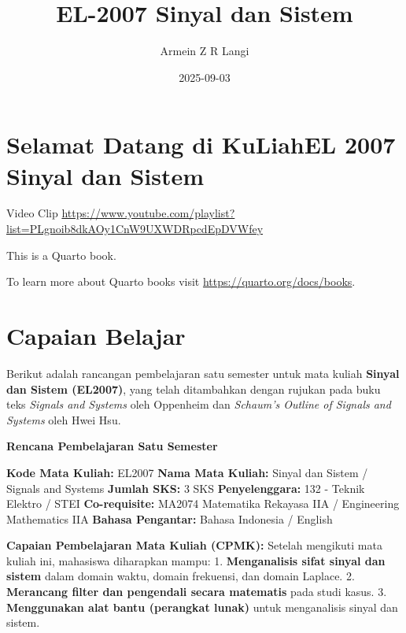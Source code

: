 \documentclass[
  letterpaper,
  DIV=11,
  numbers=noendperiod]{scrreprt}
\title{EL-2007 Sinyal dan Sistem}
\author{Armein Z R Langi}
\date{2025-09-03}
\renewcommand*\contentsname{Table of contents}
\newcommand\contentsname{Table of contents}
\begin{document}
\maketitle

\renewcommand*\contentsname{Table of contents}
{
\hypersetup{linkcolor=}
\setcounter{tocdepth}{2}
\tableofcontents
}


\chapter*{Selamat Datang di KuLiahEL 2007 Sinyal dan
Sistem}\label{selamat-datang-di-kuliahel-2007-sinyal-dan-sistem}


Video Clip
\url{https://www.youtube.com/playlist?list=PLgnoib8dkAOy1CnW9UXWDRpcdEpDVWfey}

This is a Quarto book.

To learn more about Quarto books visit
\url{https://quarto.org/docs/books}.


\chapter{Capaian Belajar}\label{capaian-belajar}

Berikut adalah rancangan pembelajaran satu semester untuk mata kuliah
\textbf{Sinyal dan Sistem (EL2007)}, yang telah ditambahkan dengan
rujukan pada buku teks \emph{Signals and Systems} oleh Oppenheim dan
\emph{Schaum's Outline of Signals and Systems} oleh Hwei Hsu.

\textbf{Rencana Pembelajaran Satu Semester}

\textbf{Kode Mata Kuliah:} EL2007 \textbf{Nama Mata Kuliah:} Sinyal dan
Sistem / Signals and Systems \textbf{Jumlah SKS:} 3 SKS
\textbf{Penyelenggara:} 132 - Teknik Elektro / STEI
\textbf{Co-requisite:} MA2074 Matematika Rekayasa IIA / Engineering
Mathematics IIA \textbf{Bahasa Pengantar:} Bahasa Indonesia / English

\textbf{Capaian Pembelajaran Mata Kuliah (CPMK):} Setelah mengikuti mata
kuliah ini, mahasiswa diharapkan mampu: 1. \textbf{Menganalisis sifat
sinyal dan sistem} dalam domain waktu, domain frekuensi, dan domain
Laplace. 2. \textbf{Merancang filter dan pengendali secara matematis}
pada studi kasus. 3. \textbf{Menggunakan alat bantu (perangkat lunak)}
untuk menganalisis sinyal dan sistem.
\end{document}
